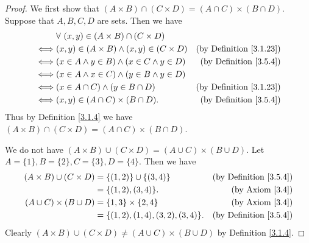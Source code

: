 \begin{proof}
    We first show that \((A \times B) \cap (C \times D) = (A \cap C) \times (B \cap D)\).
    Suppose that \(A, B, C, D\) are sets.
    Then we have
    \begin{align*}
             & \forall\ (x, y) \in (A \times B) \cap (C \times D)                                          \\
        \iff & (x, y) \in (A \times B) \land (x, y) \in (C \times D) & \text{(by Definition \ref{3.1.23})} \\
        \iff & (x \in A \land y \in B) \land (x \in C \land y \in D) & \text{(by Definition \ref{3.5.4})}  \\
        \iff & (x \in A \land x \in C) \land (y \in B \land y \in D)                                       \\
        \iff & (x \in A \cap C) \land (y \in B \cap D)               & \text{(by Definition \ref{3.1.23})} \\
        \iff & (x, y) \in (A \cap C) \times (B \cap D).              & \text{(by Definition \ref{3.5.4})}
    \end{align*}
    Thus by Definition \ref{3.1.4} we have \((A \times B) \cap (C \times D) = (A \cap C) \times (B \cap D)\).

    We do not have \((A \times B) \cup (C \times D) = (A \cup C) \times (B \cup D)\).
    Let \(A = \{1\}, B = \{2\}, C = \{3\}, D = \{4\}\).
    Then we have
    \begin{align*}
        (A \times B) \cup (C \times D) & = \{(1, 2)\} \cup \{(3, 4)\}          & \text{(by Definition \ref{3.5.4})} \\
                                       & = \{(1, 2), (3, 4)\}.                 & \text{(by Axiom \ref{3.4})}        \\
        (A \cup C) \times (B \cup D)   & = \{1, 3\} \times \{2, 4\}            & \text{(by Axiom \ref{3.4})}        \\
                                       & = \{(1, 2), (1, 4), (3, 2), (3, 4)\}. & \text{(by Definition \ref{3.5.4})}
    \end{align*}
    Clearly \((A \times B) \cup (C \times D) \neq (A \cup C) \times (B \cup D)\) by Definition \ref{3.1.4}.


\end{proof}
